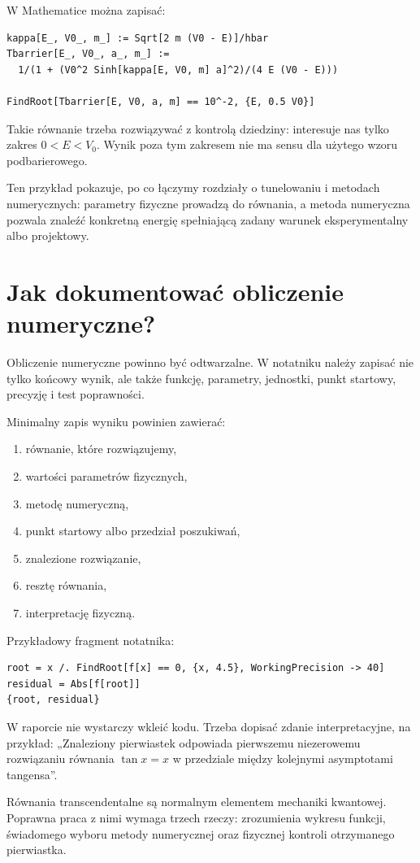 W Mathematice można zapisać:
\begin{verbatim}
kappa[E_, V0_, m_] := Sqrt[2 m (V0 - E)]/hbar
Tbarrier[E_, V0_, a_, m_] :=
  1/(1 + (V0^2 Sinh[kappa[E, V0, m] a]^2)/(4 E (V0 - E)))

FindRoot[Tbarrier[E, V0, a, m] == 10^-2, {E, 0.5 V0}]
\end{verbatim}
Takie równanie trzeba rozwiązywać z kontrolą dziedziny: interesuje nas tylko zakres \(0<E<V_0\). Wynik poza tym zakresem nie ma sensu dla użytego wzoru podbarierowego.

Ten przykład pokazuje, po co łączymy rozdziały o tunelowaniu i metodach numerycznych: parametry fizyczne prowadzą do równania, a metoda numeryczna pozwala znaleźć konkretną energię spełniającą zadany warunek eksperymentalny albo projektowy.

\section{Jak dokumentować obliczenie numeryczne?}

Obliczenie numeryczne powinno być odtwarzalne. W notatniku należy zapisać nie tylko końcowy wynik, ale także funkcję, parametry, jednostki, punkt startowy, precyzję i test poprawności.

Minimalny zapis wyniku powinien zawierać:
\begin{enumerate}
    \item równanie, które rozwiązujemy,
    \item wartości parametrów fizycznych,
    \item metodę numeryczną,
    \item punkt startowy albo przedział poszukiwań,
    \item znalezione rozwiązanie,
    \item resztę równania,
    \item interpretację fizyczną.
\end{enumerate}

Przykładowy fragment notatnika:
\begin{verbatim}
root = x /. FindRoot[f[x] == 0, {x, 4.5}, WorkingPrecision -> 40]
residual = Abs[f[root]]
{root, residual}
\end{verbatim}

W raporcie nie wystarczy wkleić kodu. Trzeba dopisać zdanie interpretacyjne, na przykład: „Znaleziony pierwiastek odpowiada pierwszemu niezerowemu rozwiązaniu równania \(\tan x=x\) w przedziale między kolejnymi asymptotami tangensa”.

\begin{summarybox}
Równania transcendentalne są normalnym elementem mechaniki kwantowej. Poprawna praca z nimi wymaga trzech rzeczy: zrozumienia wykresu funkcji, świadomego wyboru metody numerycznej oraz fizycznej kontroli otrzymanego pierwiastka.
\end{summarybox}
